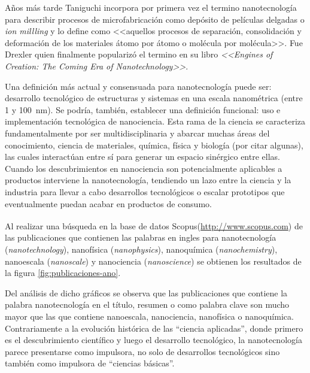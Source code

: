 	 Años más tarde Taniguchi incorpora por primera vez el termino nanotecnología para describir procesos de microfabricación como depósito de películas delgadas o \textit{ion millling} y lo define como <<aquellos procesos de separación, consolidación y deformación de los materiales átomo por átomo o molécula por molécula>>. \cite{taniguchi1974} Fue Drexler quien finalmente popularizó el termino en su libro \textit{<<Engines of Creation: The Coming Era of Nanotechnology>>}\cite{drexler1987}. 

	 Una definición más actual y consensuada para nanotecnología puede ser: desarrollo tecnológico de estructuras y sistemas en una escala nanométrica (entre 1 y \SI{100}{\nm}). Se podría, también, establecer una definición funcional: uso e implementación tecnológica de nanociencia. Esta rama de la ciencia se caracteriza fundamentalmente por ser multidisciplinaria y abarcar muchas áreas del conocimiento, ciencia de materiales, química, física y biología (por citar algunas), las cuales interactúan entre sí para generar un espacio sinérgico entre ellas. Cuando los descubrimientos en nanociencia son potencialmente aplicables a productos interviene la nanotecnología, tendiendo un lazo entre la ciencia y la industria para llevar a cabo desarrollos tecnológicos o escalar prototipos que eventualmente puedan acabar en productos de consumo.
	
	 Al realizar una búsqueda en la base de datos Scopus\textsuperscript\textregistered (\url{http://www.scopus.com}) de las publicaciones que contienen las palabras en ingles para nanotecnología (\textit{nanotechnology}), nanofísica (\textit{nanophysics}), nanoquímica (\textit{nanochemistry}), nanoescala (\textit{nanoscale}) y nanociencia (\textit{nanoscience}) se obtienen los resultados de la figura \ref{fig:publicaciones-ano}. 

	 Del análisis de dicho gráficos se observa que las publicaciones que contiene la palabra nanotecnología en el título, resumen o como palabra clave son mucho mayor que las que contiene nanoescala, nanociencia, nanofísica o nanoquímica. Contrariamente a la evolución histórica de las ``ciencia aplicadas'', donde primero es el descubrimiento científico y luego el desarrollo tecnológico, la nanotecnología parece presentarse como impulsora, no solo de desarrollos tecnológicos sino también como impulsora de ``ciencias básicas''.

